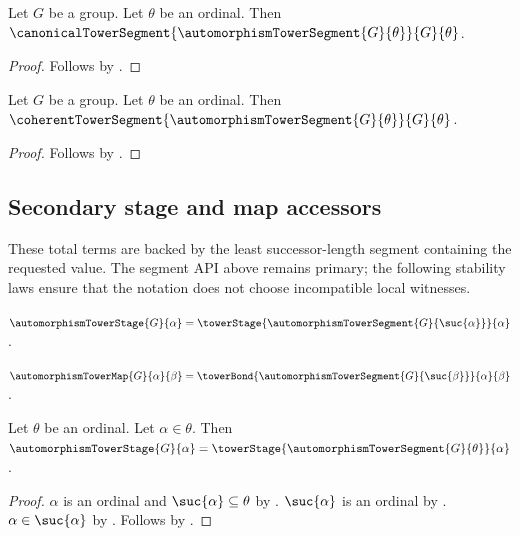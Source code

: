 \begin{theorem}\label{automorphism_tower_segment_is_canonical}
    Let $G$ be a group.
    Let $\theta$ be an ordinal.
    Then $\canonicalTowerSegment
        {\automorphismTowerSegment{G}{\theta}}{G}{\theta}$.
\end{theorem}
\begin{proof}
    Follows by
        .
\end{proof}

\begin{corollary}\label{automorphism_tower_segment_is_coherent}
    Let $G$ be a group.
    Let $\theta$ be an ordinal.
    Then $\coherentTowerSegment
        {\automorphismTowerSegment{G}{\theta}}{G}{\theta}$.
\end{corollary}
\begin{proof}
    Follows by
        .
\end{proof}

\subsection{Secondary stage and map accessors}

These total terms are backed by the least successor-length segment containing
the requested value.  The segment API above remains primary; the following
stability laws ensure that the notation does not choose incompatible local
witnesses.

\begin{definition}\label{automorphism_tower_stage}
    $\automorphismTowerStage{G}{\alpha}=
        \towerStage{\automorphismTowerSegment{G}{\suc{\alpha}}}{\alpha}$.
\end{definition}

\begin{definition}\label{automorphism_tower_map}
    $\automorphismTowerMap{G}{\alpha}{\beta}=
        \towerBond{\automorphismTowerSegment{G}{\suc{\beta}}}
            {\alpha}{\beta}$.
\end{definition}

\begin{proposition}\label{automorphism_tower_stage_on_segment}
    Let $\theta$ be an ordinal.
    Let $\alpha\in\theta$.
    Then $\automorphismTowerStage{G}{\alpha}=
        \towerStage{\automorphismTowerSegment{G}{\theta}}{\alpha}$.
\end{proposition}
\begin{proof}
    $\alpha$ is an ordinal and $\suc{\alpha}\subseteq\theta$ by
        .
    $\suc{\alpha}$ is an ordinal by .
    $\alpha\in\suc{\alpha}$ by .
    Follows by
        .
\end{proof}

